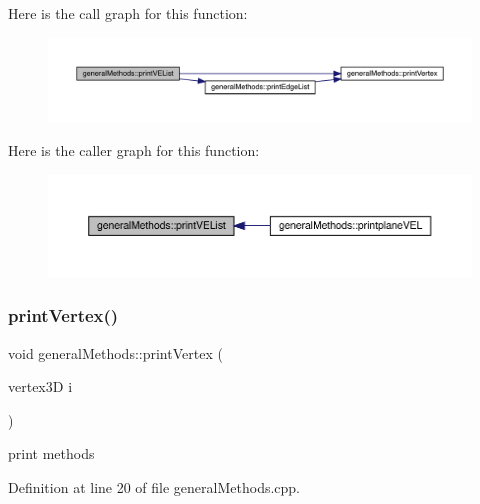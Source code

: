Here is the call graph for this function\+:
\nopagebreak
\begin{figure}[H]
\begin{center}
\leavevmode
\includegraphics[width=350pt]{namespacegeneral_methods_a60a9e0ba058824389fc703dc2dbbb7e3_cgraph}
\end{center}
\end{figure}
Here is the caller graph for this function\+:
\nopagebreak
\begin{figure}[H]
\begin{center}
\leavevmode
\includegraphics[width=350pt]{namespacegeneral_methods_a60a9e0ba058824389fc703dc2dbbb7e3_icgraph}
\end{center}
\end{figure}
\mbox{\label{namespacegeneral_methods_a694306c7472ee1bbfb3c90c0f3d5453a}} 
\subsubsection{\texorpdfstring{print\+Vertex()}{printVertex()}}
{\footnotesize\ttfamily void general\+Methods\+::print\+Vertex (\begin{DoxyParamCaption}\item[{vertex3D}]{i }\end{DoxyParamCaption})}

print methods 

Definition at line 20 of file general\+Methods.\+cpp.

